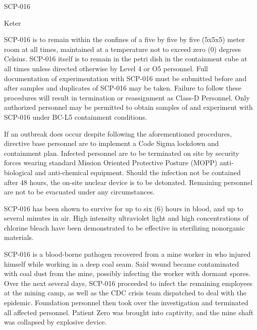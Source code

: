 
 SCP-016

 Keter

 SCP-016 is to remain within the confines of a five by five by five (5x5x5) meter room at all times, maintained at a temperature not to exceed zero (0) degrees Celsius. SCP-016 itself is to remain in the petri dish in the containment cube at all times unless directed otherwise by Level 4 or O5 personnel. Full documentation of experimentation with SCP-016 must be submitted before and after samples and duplicates of SCP-016 may be taken. Failure to follow these procedures will result in termination or reassignment as Class-D Personnel. Only authorized personnel may be permitted to obtain samples of and experiment with SCP-016 under BC-L5 containment conditions.

If an outbreak does occur despite following the aforementioned procedures, directive base personnel are to implement a Code Sigma lockdown and containment plan. Infected personnel are to be terminated on site by security forces wearing standard Mission Oriented Protective Posture (MOPP) anti-biological and anti-chemical equipment. Should the infection not be contained after 48 hours, the on-site nuclear device is to be detonated. Remaining personnel are not to be evacuated under any circumstances.

SCP-016 has been shown to survive for up to six (6) hours in blood, and up to several minutes in air. High intensity ultraviolet light and high concentrations of chlorine bleach have been demonstrated to be effective in sterilizing nonorganic materials.

 SCP-016 is a blood-borne pathogen recovered from a mine worker in  who injured himself while working in a deep coal seam. Said wound became contaminated with coal dust from the mine, possibly infecting the worker with dormant spores. Over the next several days, SCP-016 proceeded to infect the remaining employees at the mining camp, as well as the CDC crisis team dispatched to deal with the epidemic. Foundation personnel then took over the investigation and terminated all affected personnel. Patient Zero was brought into captivity, and the mine shaft was collapsed by explosive device.

